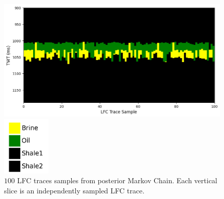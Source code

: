 \documentclass[note,screen,english,12pt,utf8]{nrdoc}
\begin{document}
\begin{figure}[htbp]
    \begin{minipage}[valign=t]{0.9\textwidth}
        \includegraphics[width=\textwidth]{figures/lfc_traces_sampled_il57_xl62.png}
    \end{minipage}%
    \begin{minipage}[valign=t]{0.1\textwidth}
        \includegraphics[width=\textwidth]{figures/lfc_legend.png}
    \end{minipage}
    \label{fig:lfc_traces}
    \caption{$100$ LFC traces samples from posterior Markov Chain.
             Each vertical slice is an independently sampled LFC trace.
    }
\end{figure}
\end{document}
